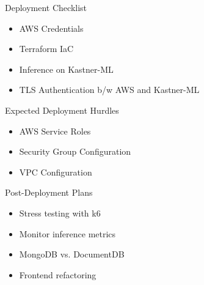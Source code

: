 \begin{frame}{Deployment Checklist}
    \begin{itemize}
        \item AWS Credentials
        \item Terraform IaC
        \item Inference on Kastner-ML
        \item TLS Authentication b/w AWS and Kastner-ML
    \end{itemize}    
\end{frame}

\begin{frame}{Expected Deployment Hurdles}
    \begin{itemize}
        \item AWS Service Roles
        \item Security Group Configuration
        \item VPC Configuration
    \end{itemize}    
\end{frame}

\begin{frame}{Post-Deployment Plans}
    \begin{itemize}
        \item Stress testing with k6
        \item Monitor inference metrics
        \item MongoDB vs. DocumentDB
        \item Frontend refactoring 
    \end{itemize}    
\end{frame}




